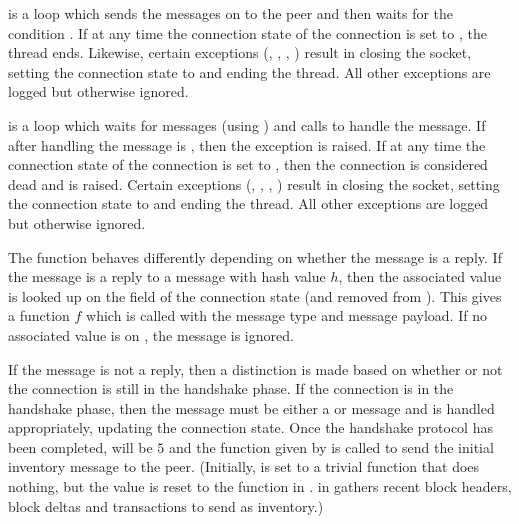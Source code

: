 {} is a loop which 
sends the messages on {} to the peer
and then waits for the condition {}.
If at any time the connection state of the connection is set to {},
the thread ends.
Likewise, certain exceptions ({}, {}, {}, {})
result in closing the socket, setting the connection state to {} and ending the thread.
All other exceptions are logged but otherwise ignored.

{} is a loop which waits for messages (using {})
and calls {} to handle the message.
If after handling the message {} is {}, then the
exception {} is raised.
If at any time the connection state of the connection is set to {},
then the connection is considered dead and {} is raised.
Certain exceptions ({}, {}, {}, {})
result in closing the socket, setting the connection state to {} and ending the thread.
All other exceptions are logged but otherwise ignored.

The function {} behaves differently depending on whether the message is a reply.
If the message is a reply to a message with hash value $h$, then
the associated value is looked up on the {} field of the connection state
(and removed from {}).
This gives a function $f$ which is called with the message type and message payload.
If no associated value is on {}, the message is ignored.

If the message is not a reply, then a distinction is made based on whether or not the
connection is still in the handshake phase.
If the connection is in the handshake phase, then the message must be either a
{} or {} message
and is handled appropriately, updating the connection state.
Once the handshake protocol has been completed, {} will be $5$
and
the function given by {} is called to send the initial
inventory message to the peer.
(Initially, {} is set to a trivial function that does nothing,
but the value is reset to the {} function in {}.
{} in {} gathers recent block headers, block deltas and transactions
to send as inventory.)

